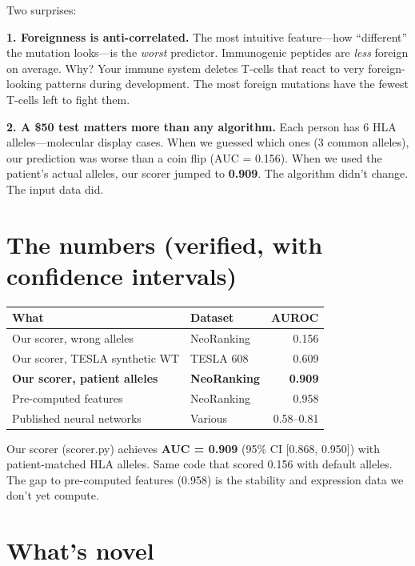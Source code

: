 \documentclass[12pt]{article}
\begin{document}
Two surprises:

\textbf{1. Foreignness is anti-correlated.} The most intuitive feature---how ``different'' the mutation looks---is the \textit{worst} predictor. Immunogenic peptides are \textit{less} foreign on average. Why? Your immune system deletes T-cells that react to very foreign-looking patterns during development. The most foreign mutations have the fewest T-cells left to fight them.

\textbf{2. A \$50 test matters more than any algorithm.} Each person has 6 HLA alleles---molecular display cases. When we guessed which ones (3 common alleles), our prediction was worse than a coin flip (AUC = 0.156). When we used the patient's actual alleles, our scorer jumped to \textbf{0.909}. The algorithm didn't change. The input data did.

\section*{The numbers (verified, with confidence intervals)}

\begin{center}
\begin{tabular}{llr}
\toprule
What & Dataset & AUROC \\
\midrule
Our scorer, wrong alleles & NeoRanking & 0.156 \\
Our scorer, TESLA synthetic WT & TESLA 608 & 0.609 \\
\textbf{Our scorer, patient alleles} & \textbf{NeoRanking} & \textbf{0.909} \\
Pre-computed features & NeoRanking & 0.958 \\
Published neural networks & Various & 0.58--0.81 \\
\bottomrule
\end{tabular}
\end{center}

Our scorer (scorer.py) achieves \textbf{AUC = 0.909} (95\% CI [0.868, 0.950]) with patient-matched HLA alleles. Same code that scored 0.156 with default alleles. The gap to pre-computed features (0.958) is the stability and expression data we don't yet compute.

\section*{What's novel}
\end{document}
